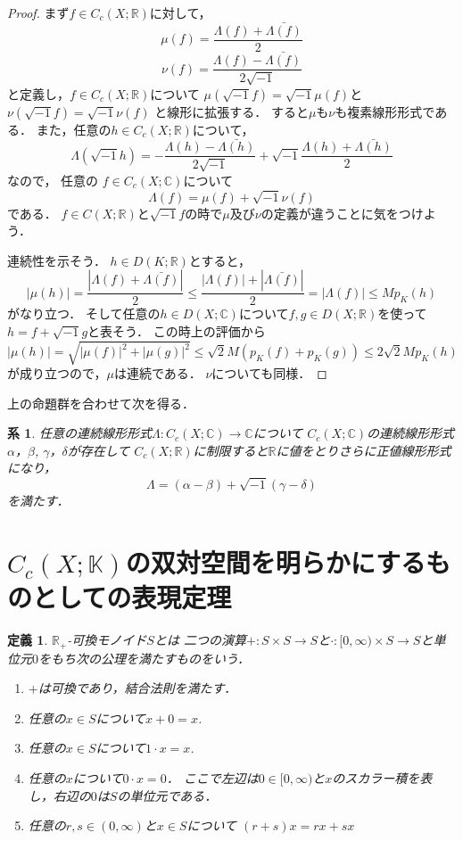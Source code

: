 \documentclass[leqno]{jsarticle}
\newtheorem{cor}[thm]{系}
\newtheorem{df}[thm]{定義}
\newcommand{\rr}{\mathbb{R}}
\newcommand{\cc}{\mathbb{C}}
\newcommand{\kk}{\mathbb{K}}
\begin{document}
\begin{proof}
まず$f\in C_c(X; \rr)$に対して，
\[
\mu(f)=\frac{\Lambda(f)+\bar{\Lambda(f)}}{2}
\]
\[
\nu(f)=\frac{\Lambda(f)-\bar{\Lambda(f)}}{2\sqrt{-1}}
\]
と定義し，$f\in C_c(X; \rr)$について
$\mu(\sqrt{-1}f)=\sqrt{-1}\mu(f)$と
$\nu(\sqrt{-1}f)=\sqrt{-1}\nu(f)$
と線形に拡張する．
すると$\mu$も$\nu$も複素線形形式である．
また，任意の$h\in C_c(X; \rr)$について，
\[
\Lambda(\sqrt{-1}h)=-\frac{\Lambda(h)-\bar{\Lambda(h)}}{2\sqrt{-1}}
+\sqrt{-1}\frac{\Lambda(h)+\bar{\Lambda(h)}}{2}
\]
なので，
任意の $f\in C_c(X; \cc)$について
\[
\Lambda(f)=\mu(f)+\sqrt{-1}\nu(f)
\]
である．
$f\in C(X; \rr)$と$\sqrt{-1}f$の時で$\mu$及び$\nu$の定義が違うことに気をつけよう．

連続性を示そう．
$h\in D(K; \rr)$とすると，
 \[
 |\mu(h)|=\frac{|\Lambda(f)+\bar{\Lambda(f)}|}{2}\le
 \frac{|\Lambda(f)|+|\bar{\Lambda(f)}|}{2}  = |\Lambda(f)|\le Mp_K(h)
 \]
 がなり立つ．
そして任意の$h\in D(X; \cc)$について$f, g\in D(X; \rr)$を使って
$h=f+\sqrt{-1}g$と表そう．
この時上の評価から
\[
|\mu(h)|=\sqrt{|\mu(f)|^2+|\mu(g)|^2}\le \sqrt{2}M(p_K(f)+p_K(g))\le 2\sqrt{2}Mp_K(h)
\]
が成り立つので，$\mu$は連続である．
 $\nu$についても同様．
\end{proof}
上の命題群を合わせて次を得る．
\begin{cor}\label{daiji2}
任意の連続線形形式$\Lambda: C_c(X; \cc)\to \cc$について
$C_c(X; \cc)$の連続線形形式$\alpha$，$\beta$, 
$\gamma$，$\delta$が存在して
$C_c(X; \rr)$に制限すると$\rr$に値をとりさらに正値線形形式になり，
\[
\Lambda=(\alpha-\beta)+\sqrt{-1}(\gamma-\delta)
\]
を満たす．
\end{cor}

\section{$C_c(X; \kk)$の双対空間を明らかにするものとしての表現定理}
\begin{df}
$\rr_+$-可換モノイド$S$とは
二つの演算$\mathord{+}\colon S\times S\to S$と$\mathord{\cdot}\colon [0, \infty)\times S\to S$と単位元$0$をもち次の公理を満たすものをいう．
\begin{enumerate}
\item $+$は可換であり，結合法則を満たす．
\item 任意の$x\in S$について$x+0=x$. 
\item 任意の$x\in S$について$1\cdot x=x$. 
\item 任意の$x$について$0\cdot x=0$．
ここで左辺は$0\in [0,\infty)$と$x$のスカラー積を表し，右辺の$0$は$S$の単位元である．
\item 任意の$r, s\in (0, \infty)$と$x\in S$について
$(r+s)x=rx+sx$
\end{enumerate}
\end{df}
\end{document}
